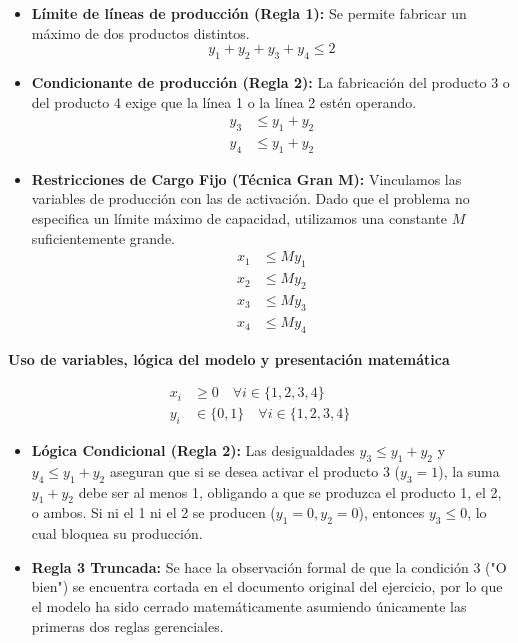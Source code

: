 \documentclass[10pt,a4paper]{article}
\begin{document}
\begin{itemize}
    \item \textbf{Límite de líneas de producción (Regla 1):} Se permite fabricar un máximo de dos productos distintos.
    \[ y_1 + y_2 + y_3 + y_4 \le 2 \]

    \item \textbf{Condicionante de producción (Regla 2):} La fabricación del producto 3 o del producto 4 exige que la línea 1 o la línea 2 estén operando.
    \begin{align*}
        y_3 &\le y_1 + y_2 \\
        y_4 &\le y_1 + y_2
    \end{align*}

    \item \textbf{Restricciones de Cargo Fijo (Técnica Gran M):} Vinculamos las variables de producción con las de activación. Dado que el problema no especifica un límite máximo de capacidad, utilizamos una constante $M$ suficientemente grande.
    \begin{align*}
        x_1 &\le M y_1 \\
        x_2 &\le M y_2 \\
        x_3 &\le M y_3 \\
        x_4 &\le M y_4
    \end{align*}
\end{itemize}

\vspace{3mm}
\textbf{Uso de variables, lógica del modelo y presentación matemática}

\begin{align*}
    x_i &\ge 0 \quad \forall i \in \{1, 2, 3, 4\} \\
    y_i &\in \{0, 1\} \quad \forall i \in \{1, 2, 3, 4\}
\end{align*}

\begin{nota}{}
\begin{itemize}
    \item \textbf{Lógica Condicional (Regla 2):} Las desigualdades $y_3 \le y_1 + y_2$ y $y_4 \le y_1 + y_2$ aseguran que si se desea activar el producto 3 ($y_3=1$), la suma $y_1 + y_2$ debe ser al menos 1, obligando a que se produzca el producto 1, el 2, o ambos. Si ni el 1 ni el 2 se producen ($y_1=0, y_2=0$), entonces $y_3 \le 0$, lo cual bloquea su producción.
    \item \textbf{Regla 3 Truncada:} Se hace la observación formal de que la condición 3 ("O bien") se encuentra cortada en el documento original del ejercicio, por lo que el modelo ha sido cerrado matemáticamente asumiendo únicamente las primeras dos reglas gerenciales.
\end{itemize}
\end{nota}
\end{document}
